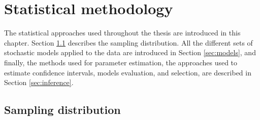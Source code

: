 \chapter{Statistical methodology}
\label{ch:3.0}

The statistical approaches used throughout the thesis are introduced in this chapter.
Section \ref{sec:sampling.distribution} describes the sampling distribution.
All the different sets of stochastic models applied to the data 
are introduced in Section \ref{sec:models}, and finally, the %
methods used 
for parameter estimation, the approaches used to estimate confidence intervals, models evaluation, and selection, are described in Section \ref{sec:inference}.



\section{Sampling distribution}
\label{sec:sampling.distribution}


